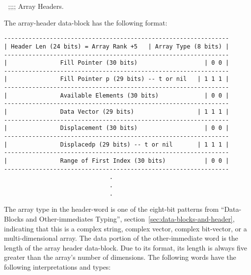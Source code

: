 
;;;; Array Headers.

The array-header data-block has the following format:
\begin{verbatim}
----------------------------------------------------------------
| Header Len (24 bits) = Array Rank +5   | Array Type (8 bits) |
----------------------------------------------------------------
|               Fill Pointer (30 bits)                   | 0 0 | 
----------------------------------------------------------------
|               Fill Pointer p (29 bits) -- t or nil   | 1 1 1 |
----------------------------------------------------------------
|               Available Elements (30 bits)             | 0 0 | 
----------------------------------------------------------------
|               Data Vector (29 bits)                  | 1 1 1 | 
----------------------------------------------------------------
|               Displacement (30 bits)                   | 0 0 | 
----------------------------------------------------------------
|               Displacedp (29 bits) -- t or nil       | 1 1 1 | 
----------------------------------------------------------------
|               Range of First Index (30 bits)           | 0 0 | 
----------------------------------------------------------------
                              .
                              .
                              .

\end{verbatim}
The array type in the header-word is one of the eight-bit patterns from 
``Data-Blocks and Other-immediates Typing'', section~\ref{sec:data-blocks-and-header}, indicating that this is a complex
string, complex vector, complex bit-vector, or a multi-dimensional array.  The
data portion of the other-immediate word is the length of the array header
data-block.  Due to its format, its length is always five greater than the
array's number of dimensions.  The following words have the following
interpretations and types:
